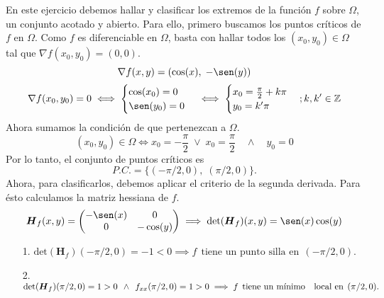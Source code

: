 \begin{solution}
En este ejercicio debemos hallar y clasificar los extremos de la función $f$ sobre $\Omega$,  un conjunto acotado y abierto.  
Para ello,    primero buscamos los puntos críticos de $f$ en $\Omega$. Como $f$ es diferenciable en  $\Omega$, basta con hallar todos los $(x_0,y_0) \in  \Omega$ tal que $\nabla f(x_0,y_0)=(0,0).$     
\[
    \nabla f(x,y)=\left(\cos(x),\;-\sen(y)\right)
  \]
    \[
    \nabla f(x_0,y_0) =0 \iff \begin{cases}
        \cos(x_0)=0 \\ \sen(y_0)=0
    \end{cases} \iff \begin{cases}
        x_0 = \frac{\pi}{2}+k\pi\\
        y_0 = k'\pi
    \end{cases};k,k'\in\mathbb{Z}
    \]
    Ahora sumamos la condición de que pertenezcan a $\Omega$.
    \[
    (x_0,y_0)\in\Omega\iff x_0=-\frac{\pi}{2}\;\lor\;x_0=\frac{\pi}{2}\quad\land\quad y_0=0
    \]
    Por lo tanto,  el conjunto de puntos críticos es
    \[
    P.C.=\{(-\pi/2,0),\;(\pi/2,0)\}.
    \]
    Ahora, para clasificarlos, debemos aplicar el criterio de la segunda derivada. Para ésto calculamos la matriz hessiana de $f$.
    \[
    \boldsymbol{H}_f(x,y)=\left(\begin{matrix}
        -\sen(x) & 0 \\ 0 & -\cos(y)
    \end{matrix}\right)\implies \text{det}(\boldsymbol{H}_f)(x,y)=\sen(x)\cos(y)
    \]
   
   \begin{itemize}
   \item[1.] $\text{det}(\boldsymbol{H}_f)(-\pi/2,0)=-1<0 \implies f\:\:\text{tiene un punto silla en}\:\: (-\pi/2,0).$
    \item[2.] $\text{det}(\boldsymbol{H}_f)(\pi/2,0)=1>0 \:\:\land\:\: f_{xx}(\pi/2,0)=1>0\implies f\:\:\text{tiene un mínimo} \\
   \quad \text{local en}\:\:(\pi/2,0).$
    \end{itemize}
    \end{solution}
